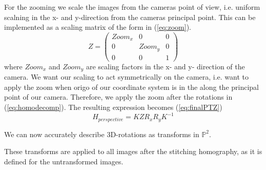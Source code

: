 	For the zooming we scale the images from the cameras point of view, i.e. uniform scalning in the x- and y-direction from the cameras principal point. 
	This can be implemented as a scaling matrix of the form in (\ref{eq:zoom}).
	\begin{equation}
		Z=\begin{pmatrix} 
			Zoom_x & 0 & 0 \\
			0 & Zoom_y & 0 \\
			0 & 0 & 1
		\end{pmatrix}
		\label{eq:zoom}
	\end{equation}
	where $Zoom_x$ and $Zoom_y$ are scaling factors in the x- and y- direction of the camera.
	We want our scaling to act symmetrically on the camera, i.e. want to apply the zoom when origo of our coordinate system is in the along the principal point of our camera. 
	Therefore, we apply the zoom after the rotations in (\ref{eq:homodecomp}). The resulting expression becomes (\ref{eq:finalPTZ})
	\begin{equation}
		H_{perspective}=K Z  R_{x}R_{y}  K^{-1}
		\label{eq:finalPTZ}
	\end{equation}

	We can now accurately describe 3D-rotations as transforms in $\mathbb{P}^2$.

These transforms are applied to all images after the stitching homography, as it is defined for the untransformed images.
